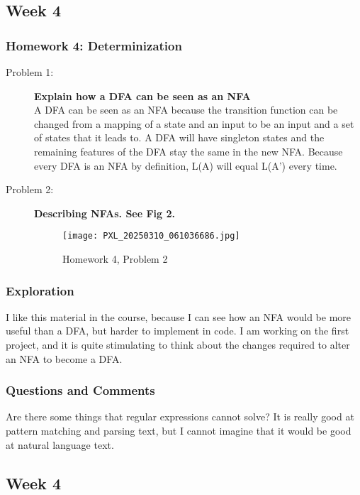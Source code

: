 \documentclass{article}
\theoremstyle{theorem}
\theoremstyle{definition}
\theoremstyle{remark}
\begin{document}
\subsection{Week 4}
\subsubsection{Homework 4: Determinization}
\begin{description}
\item[Problem 1: ] \textbf{Explain how a DFA can be seen as an NFA}\\

A DFA can be seen as an NFA because the transition function can be changed from a mapping of a state and an input to be an input and a set of states that it leads to. A DFA will have singleton states and the remaining features of the DFA stay the same in the new NFA. Because every DFA is an NFA by definition, L(A) will equal L(A') every time.

\item[Problem 2: ] \textbf{Describing NFAs. See Fig 2.}\\
\begin{figure}
    \centering
    \texttt{[image: PXL\_20250310\_061036686.jpg]}
    \caption{Homework 4, Problem 2}
    \label{fig:enter-label}
\end{figure}
\end{description}

\subsubsection{Exploration}
I like this material in the course, because I can see how an NFA would be more useful than a DFA, but harder to implement in code. I am working on the first project, and it is quite stimulating to think about the changes required to alter an NFA to become a DFA.

\subsubsection{Questions and Comments}
Are there some things that regular expressions cannot solve? It is really good at pattern matching and parsing text, but I cannot imagine that it would be good at natural language text.

\subsection{Week 4}
\end{document}
